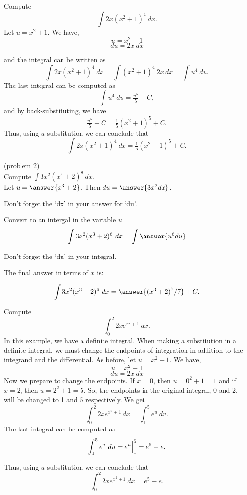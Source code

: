 \documentclass{ximera}
\begin{document}
\begin{example}[example 2] Compute 
\[\int 2x(x^2 + 1)^4 \ dx.\]
Let $u = x^2 + 1$.  We have,
\[u = x^2 + 1\]
\[du = 2x \ dx\]

and the integral can be written as 
\[\int 2x(x^2 + 1)^4 \ dx = \int (x^2 + 1)^4 \ 2x \  dx = \int u^4 \ du.\]
The last integral can be computed as 
\[\int u^4 \ du = \tfrac{u^5}{5} + C,\]
and by back-substituting, we have 
\[\tfrac{u^5}{5} + C = \tfrac15(x^2 + 1)^5 + C .\]
Thus, using $u$-substitution we can conclude that
\[\int 2x(x^2 + 1)^4 \ dx  =  \tfrac15(x^2 + 1)^5 + C.\]
\end{example}

\begin{problem}(problem 2)\\
Compute $\displaystyle{\int 3x^2(x^3 + 2)^6 \ dx}$.\\
Let $u = \answer{x^3 + 2}$. Then $du = \answer{3x^2 dx}$.\\
\begin{hint}
Don't forget the `dx' in your answer for `du'.
\end{hint}
Convert to an intergal in the variable $u$:
\[\int 3x^2(x^3 + 2)^6 \ dx = \int\answer{u^6 du}\]
\begin{hint}
Don't forget the `du' in your integral.
\end{hint}
The final answer in terms of $x$ is:

\[\int 3x^2(x^3 + 2)^6 \ dx = \answer{(x^3 + 2)^7/7} +C.\]
\end{problem}



\begin{example}[example 3] Compute 
\[\int_0^2 2xe^{x^2 + 1} \ dx.\]
In this example, we have a definite integral.  When making a substitution in a definite integral, 
we must change the endpoints of integration in addition to the integrand and the differential.
As before, let $u = x^2 + 1$.  We have,
\[u = x^2 + 1\]
\[du = 2x \ dx\]
Now we prepare to change the endpoints. If $x = 0$, then $ u = 0^2 + 1 = 1$ and if $x = 2$, then $u = 2^2 +1 = 5$.
So, the endpoints in the original integral, 0 and 2, will be changed to 1 and 5 respectively. We get
\[\int_0^2 2xe^{x^2 + 1} \ dx  = \int_1^5  e^u \ du.\]
The last integral can be computed as 
\[\int_1^5 e^u \ du = e^u \Big{|}_1^5 = e^5 - e.\]

Thus, using $u$-substitution we can conclude that
\[\int_0^2 2xe^{x^2 + 1} \ dx =  e^5 - e.\]
\end{example}
\end{document}
